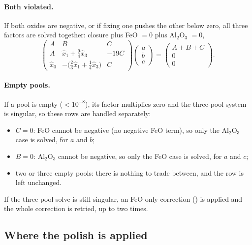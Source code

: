 \documentclass[11pt]{article}
\newcommand{\code}[1]{\texttt{\detokenize{#1}}}
\begin{document}
\paragraph{Both violated.} If both oxides are negative, or if fixing one pushes the other
below zero, all three factors are solved together: closure plus FeO $= 0$ plus
Al$_2$O$_3$ $= 0$,
\begin{equation}
  \begin{pmatrix}
    A & B & C\\
    A & \hat x_1 + \tfrac94\hat x_3 & -19C\\
    \hat x_0 & -\big(\tfrac23\hat x_1 + \tfrac14\hat x_3\big) & C
  \end{pmatrix}
  \begin{pmatrix} a\\ b\\ c \end{pmatrix}
  =
  \begin{pmatrix} A + B + C\\ 0\\ 0 \end{pmatrix}.
\end{equation}

\paragraph{Empty pools.} If a pool is empty ($< 10^{-8}$), its factor multiplies zero and
the three-pool system is singular, so these rows are handled separately:
\begin{itemize}[nosep]
  \item $C = 0$: FeO cannot be negative (no negative FeO term), so only the Al$_2$O$_3$
        case is solved, for $a$ and $b$;
  \item $B = 0$: Al$_2$O$_3$ cannot be negative, so only the FeO case is solved, for $a$
        and $c$;
  \item two or three empty pools: there is nothing to trade between, and the row is left
        unchanged.
\end{itemize}
If the three-pool solve is still singular, an FeO-only correction (\code{polish_negative_spFe})
is applied and the whole correction is retried, up to two times.

\subsection{Where the polish is applied}
\end{document}
